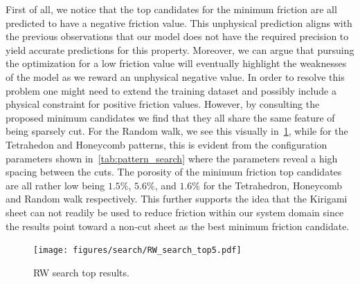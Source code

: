 First of all, we notice that the top candidates for the minimum friction are all
predicted to have a negative friction value. This unphysical prediction aligns with the previous observations that our model does not have the required precision to yield accurate predictions for this property. Moreover, we can argue that pursuing the optimization for a low friction value will eventually highlight the weaknesses of the model as we reward an unphysical negative value. In order to resolve this problem one might need to extend the training dataset and possibly include a physical constraint for positive friction values. However, by consulting the proposed minimum candidates we find that they all share the same feature of being sparsely cut.
For the Random walk, we see this visually in~\cref{fig:RW_search_top5}, while
for the Tetrahedon and Honeycomb patterns, this is evident from the
configuration parameters shown in~\cref{tab:pattern_search} where the parameters
reveal a high spacing between the cuts. The porosity of the minimum friction top
candidates are all rather low being $1.5\%$, $5.6\%$, and $1.6\%$ for the
Tetrahedron, Honeycomb and Random walk respectively. This further supports the idea that the Kirigami sheet can not readily be used to reduce friction within our system domain since the results point toward a non-cut sheet as the best minimum friction candidate.


\begin{figure}[H]
  \centering
  \texttt{[image: figures/search/RW\_search\_top5.pdf]}
  \caption{RW search top results.}
  \label{fig:RW_search_top5}
\end{figure}  


